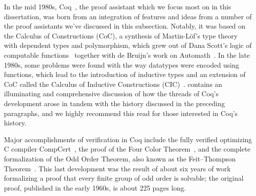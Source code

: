\begin{comment}
After a three-year effort, Trusted Logic succeeded in the formal modeling of the whole execution environment for the JavaCard language.
This work on security was awarded the EAL7 certification level (the highest level in the so-called common criteria).
This formal development required 121000 lines of \emph{Coq} development in 278 modules.

\emph{Coq} is also used to develop libraries of advanced mathematical theorems in both constructive and classical form.
The domain of classical mathematics required restrictions to the logical language of \emph{Coq} in order to remain consistent with some of the axioms that are naturally used by mathematicians.
\end{quote}
\begin{flushright}
  --- Gérard Huet and Christine Paulin-Mohring, November 2003~\cite{CoqArtForward2013Huet}
\end{flushright}
\end{comment}

In the mid 1980s, Coq~\cite{Coq}, the proof assistant which we focus most on in this dissertation, was born from an integration of features and ideas from a number of the proof assistants we've discussed in this subsection.
Notably, it was based on the Calculus of Constructions (CoC), a synthesis of Martin-Löf's type theory~\cite{Intuitionistic1975MartinLoef,Constructive1982MartinLoef} with dependent types and polymorphism, which grew out of Dana Scott's logic of computable functions~\cite{Type1993Scott} together with de Bruijn's work on Automath~\cite{CoqArtForward2013Huet}.
In the late 1980s, some problems were found with the way datatypes were encoded using functions, which lead to the introduction of inductive types and an extension of CoC called the Calculus of Inductive Constructions (CIC)~\cite{CoqArtForward2013Huet}.
\textcite{CoqArtForward2013Huet} contains an illuminating and comprehensive discussion of how the threads of Coq's development arose in tandem with the history discussed in the preceding paragraphs, and we highly recommend this read for those interested in Coq's history.

Major accomplishments of verification in Coq include the fully verified optimizing C compiler CompCert~\cite{Compcert}, the proof of the Four Color Theorem~\cite{gonthier2008formal}, and the complete formalization of the Odd Order Theorem, also known as the Feit--Thompson Theorem~\cite{gonthier2013machine}.
This last development was the result of about six years of work formalizing a proof that every finite group of odd order is solvable; the original proof, published in the early 1960s, is about 225 pages long.

